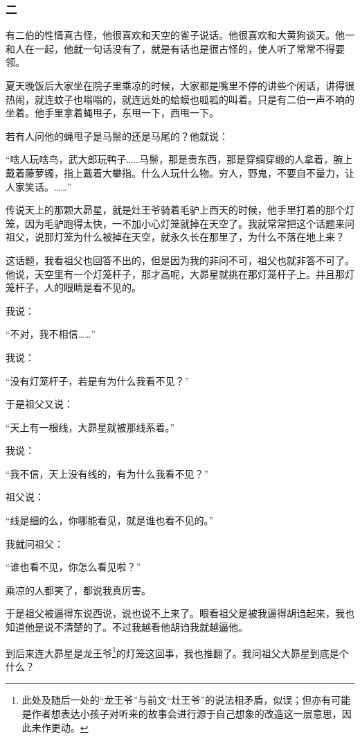 \subsubsection*{二}
\par 有二伯的性情真古怪，他很喜欢和天空的雀子说话。他很喜欢和大黄狗谈天。他一和人在一起，他就一句话没有了，就是有话也是很古怪的，使人听了常常不得要领。
\par 夏天晚饭后大家坐在院子里乘凉的时候，大家都是嘴里不停的讲些个闲话，讲得很热闹，就连蚊子也嗡嗡的，就连远处的蛤蟆也呱呱的叫着。只是有二伯一声不响的坐着。他手里拿着蝇甩子，东甩一下，西甩一下。
\par 若有人问他的蝇甩子是马鬃的还是马尾的？他就说：
\par “啥人玩啥鸟，武大郎玩鸭子……马鬃，那是贵东西，那是穿绸穿缎的人拿着，腕上戴着藤萝镯，指上戴着大攀指。什么人玩什么物。穷人，野鬼，不要自不量力，让人家笑话。……”
\par 传说天上的那颗大昴星，就是灶王爷骑着毛驴上西天的时候，他手里打着的那个灯笼，因为毛驴跑得太快，一不加小心灯笼就掉在天空了。我就常常把这个话题来问祖父，说那灯笼为什么被掉在天空，就永久长在那里了，为什么不落在地上来？
\par 这话题，我看祖父也回答不出的，但是因为我的非问不可，祖父也就非答不可了。他说，天空里有一个灯笼杆子，那才高呢，大昴星就挑在那灯笼杆子上。并且那灯笼杆子，人的眼睛是看不见的。
\par 我说：
\par “不对，我不相信……”
\par 我说：
\par “没有灯笼杆子，若是有为什么我看不见？”
\par 于是祖父又说：
\par “天上有一根线，大昴星就被那线系着。”
\par 我说：
\par “我不信，天上没有线的，有为什么我看不见？”
\par 祖父说：
\par “线是细的么，你哪能看见，就是谁也看不见的。”
\par 我就问祖父：
\par “谁也看不见，你怎么看见啦？”
\par 乘凉的人都笑了，都说我真厉害。
\par 于是祖父被逼得东说西说，说也说不上来了。眼看祖父是被我逼得胡诌起来，我也知道他是说不清楚的了。不过我越看他胡诌我就越逼他。
\par 到后来连大昴星是龙王爷\footnote{此处及随后一处的“龙王爷”与前文“灶王爷”的说法相矛盾，似误；但亦有可能是作者想表达小孩子对听来的故事会进行源于自己想象的改造这一层意思，因此未作更动。}的灯笼这回事，我也推翻了。我问祖父大昴星到底是个什么？
